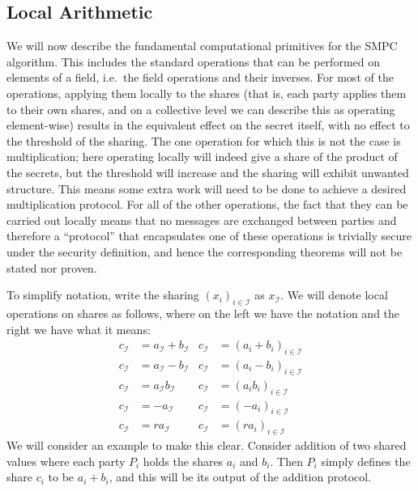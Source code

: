\documentclass{article}
\theoremstyle{remark}
\begin{document}
\subsection{Local Arithmetic}

We will now describe the fundamental computational primitives for the SMPC
algorithm. This includes the standard operations that can be performed on
elements of a field, i.e.\ the field operations and their inverses. For most of
the operations, applying them locally to the shares (that is, each party
applies them to their own shares, and on a collective level we can describe
this as operating element-wise) results in the equivalent effect on the secret
itself, with no effect to the threshold of the sharing. The one operation for
which this is not the case is multiplication; here operating locally will
indeed give a share of the product of the secrets, but the threshold will
increase and the sharing will exhibit unwanted structure. This means some extra
work will need to be done to achieve a desired multiplication protocol. For all
of the other operations, the fact that they can be carried out locally means
that no messages are exchanged between parties and therefore a ``protocol''
that encapsulates one of these operations is trivially secure under the
security definition, and hence the corresponding theorems will not be stated
nor proven.

To simplify notation, write the sharing ${(x_i)}_{i \in \mathcal{I}}$ as
$x_\mathcal{I}$. We will denote local operations on shares as follows, where on
the left we have the notation and the right we have what it means:
\begin{align*}
	c_\mathcal{I} &= a_\mathcal{I} + b_\mathcal{I} &
	c_\mathcal{I} &= {(a_i + b_i)}_{i \in \mathcal{I}}\\
	c_\mathcal{I} &= a_\mathcal{I} - b_\mathcal{I} &
	c_\mathcal{I} &= {(a_i - b_i)}_{i \in \mathcal{I}}\\
	c_\mathcal{I} &= a_\mathcal{I} b_\mathcal{I} &
	c_\mathcal{I} &= {(a_i b_i)}_{i \in \mathcal{I}}\\
	c_\mathcal{I} &= -a_\mathcal{I} &
	c_\mathcal{I} &= {(-a_i)}_{i \in \mathcal{I}}\\
	c_\mathcal{I} &= r a_\mathcal{I} &
	c_\mathcal{I} &= {(r a_i)}_{i \in \mathcal{I}}
\end{align*}
We will consider an example to make this clear. Consider addition of two shared
values where each party $P_i$ holds the shares $a_i$ and $b_i$. Then $P_i$
simply defines the share $c_i$ to be $a_i + b_i$, and this will be its output
of the addition protocol.
\end{document}
